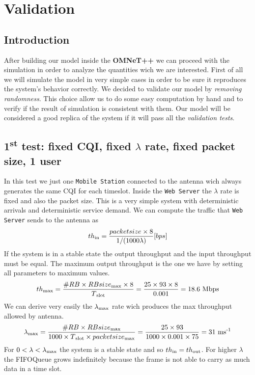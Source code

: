 \chapter{Validation}

\section{Introduction}
After building our model inside the \textbf{OMNeT++} we can proceed with the simulation in order to analyze the quantities wich we are interested. First of all we will simulate the model in very simple cases in order to be sure it reproduces the system's behavior correctly. We decided to validate our model by \textit{removing randomness}. This choice allow us to do some easy computation by hand and to verify if the result of simulation is consistent with them. Our model will be considered a good replica of the system if it will pass all the \textit{validation tests}.

\section{1\textsuperscript{st} test: fixed CQI, fixed \(\lambda\) rate, fixed packet size, 1 user}
In this test we just one \texttt{Mobile Station} connected to the antenna wich always generates the same CQI for each timeslot. Inside the \texttt{Web Server} the \(\lambda\) rate is fixed and also the packet size. This is a very simple system with deterministic arrivals and deterministic service demand. We can compute the traffic that \texttt{Web Server} sends to the antenna as \[ th\textsubscript{in} = \frac{packetsize \times 8}{1/(1000\lambda)} \lbrack bps \rbrack \] 
If the system is in a stable state the output throughput and the input throughput must be equal. The maximum output throughput is the one we have by setting all parameters to maximum values. \[ th\textsubscript{max} = \frac{\#RB \times RBsize\textsubscript{max} \times 8}{T\textsubscript{slot}} = \frac{25 \times 93 \times 8}{0.001} = 18.6 \textnormal{ Mbps} \] We can derive very easily the \(\lambda\textsubscript{max}\) rate wich produces the max throughput allowed by antenna. \[\lambda\textsubscript{max} = \frac{\#RB \times RBsize\textsubscript{max}}{1000 \times T\textsubscript{slot} \times packetsize\textsubscript{max}} = \frac{25 \times 93}{1000 \times 0.001 \times 75} = 31 \textnormal{ ms\textsuperscript{-1}} \] For \( 0<\lambda<\lambda\textsubscript{max} \) the system is a stable state and so \(th\textsubscript{in} = th\textsubscript{out}\). For higher \(\lambda\) the FIFOQueue grows indefinitely because the frame is not able to carry as much data in a time slot.

